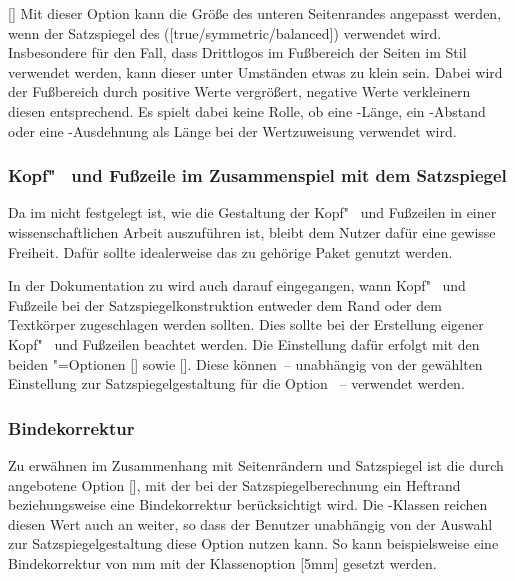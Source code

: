 \begin{Declaration}[v2.03]{[]}%
\printdeclarationlist%
%
Mit dieser Option kann die Größe des unteren Seitenrandes angepasst werden, 
wenn der Satzspiegel des \CDs ([true/symmetric/balanced]) 
verwendet wird. Insbesondere für den Fall, dass Drittlogos im Fußbereich der 
Seiten im Stil  verwendet werden, kann dieser unter 
Umständen etwas zu klein sein. Dabei wird der Fußbereich durch positive Werte 
vergrößert, negative Werte verkleinern diesen entsprechend. Es spielt dabei 
keine Rolle, ob eine -Länge, ein -Abstand oder eine 
-Ausdehnung als Länge bei der Wertzuweisung verwendet wird.
\end{Declaration}

\subsubsection{Kopf"~ und Fußzeile im Zusammenspiel mit dem Satzspiegel}
%
%
Da im \CD nicht festgelegt ist, wie die Gestaltung der Kopf"~ und Fußzeilen in 
einer wissenschaftlichen Arbeit auszuführen ist, bleibt dem Nutzer dafür eine 
gewisse Freiheit. Dafür sollte idealerweise das zu \KOMAScript{} gehörige Paket 
 genutzt werden. 

In der Dokumentation zu  wird auch darauf eingegangen, wann 
Kopf"~ und Fußzeile bei der Satzspiegelkonstruktion entweder dem Rand oder dem 
Textkörper zugeschlagen werden sollten. Dies sollte bei der Erstellung eigener 
Kopf"~ und Fußzeilen beachtet werden. Die Einstellung dafür erfolgt mit den 
beiden \KOMAScript"=Optionen [\PBoolean] sowie 
[\PBoolean]. Diese können~-- unabhängig von der gewählten 
Einstellung zur Satzspiegelgestaltung für die Option ~-- 
verwendet werden.

\subsubsection{Bindekorrektur}
%
%
Zu erwähnen im Zusammenhang mit Seitenrändern und Satzspiegel ist die durch 
 angebotene Option [], mit der bei 
der Satzspiegelberechnung ein Heftrand beziehungsweise eine Bindekorrektur 
berücksichtigt wird. Die \TUDScript-Klassen reichen diesen Wert auch an 
 weiter, so dass der Benutzer unabhängig von der Auswahl zur 
Satzspiegelgestaltung diese Option nutzen kann. So kann beispielsweise eine 
Bindekorrektur von \unit[5]{mm} mit der Klassenoption [5mm] 
gesetzt werden.

